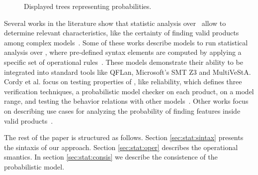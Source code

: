 \begin{figure}[h]
\begin{minipage}{0.4\hsize}
\begin{minipage}{0.2\hsize}
{}
		\end{minipage}
		
	\end{minipage}
	
	\caption{Displayed trees representing probabilities.}
	\label{fig:displayedTrees}
	
\end{figure}



Several works in the literature show that statistic analysis over \SPLs\ allow to determine relevant characteristics, like the certainty of finding valid products among complex models~\cite{tllv15,tlll15,chssgl13,dpcslsh17}. 
%
Some of these works describe models to run statistical analysis over \SPLs, where pre-defined syntax elements are computed by applying a specific set of operational rules~\cite{tllv15,tlll15}. These models demonstrate their ability to be integrated into standard tools like QFLan, Microsoft's SMT Z3 and MultiVeStA. 
%
%
Cordy et al. focus on testing properties of \SPLs, like reliability, which defines three verification techniques, a probabilistic model checker on each product, on a model range, and testing the behavior relations with other models~\cite{chssgl13}. Other works focus on describing use cases for analyzing the probability of finding features inside valid products~\cite{dpcslsh17}. %

The rest of the paper is structured as follows. Section \ref{sec:stat:sintax} presents the sintaxis of our approach. Section \ref{sec:stat:oper} describes the operational smantics. In section \ref{sec:stat:consis} we describe the consistence of the probabilistic model. 




